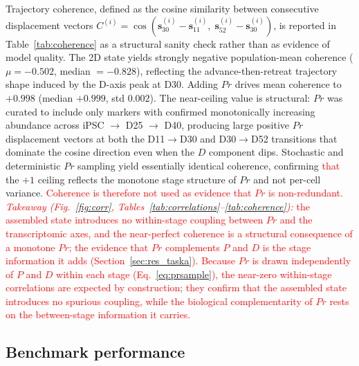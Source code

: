 \documentclass[5p,times,twocolumn]{elsarticle}
\newcommand{\rtag}[1]{}
\newcommand{\rev}[2]{\rtag{#1}\textcolor{red}{#2}}
\newcommand{\lang}[1]{\textcolor{red}{#1}}
\begin{document}
Trajectory coherence, defined as the cosine similarity between
consecutive displacement vectors
$C^{(i)} = \cos(\mathbf{s}^{(i)}_{30} - \mathbf{s}^{(i)}_{11},\;
\mathbf{s}^{(i)}_{52} - \mathbf{s}^{(i)}_{30})$,
is reported in Table~\ref{tab:coherence} as a structural sanity
check rather than as evidence of model quality.
The 2D state yields strongly negative population-mean coherence
($\mu = -0.502$, median $= -0.828$), reflecting the
advance-then-retreat trajectory shape induced by the D-axis
peak at D30.
Adding $Pr$ drives mean coherence to $+0.998$ (median $+0.999$,
std $0.002$).
The near-ceiling value is structural: $Pr$ was curated to
include only markers with confirmed monotonically increasing
abundance across iPSC $\to$ D25 $\to$ D40, producing large
positive $Pr$ displacement vectors at both the D11$\to$D30 and
D30$\to$D52 transitions that dominate the cosine direction even
when the $D$ component dips.
Stochastic and deterministic $Pr$ sampling yield essentially
identical coherence, confirming \lang{that} the $+1$ ceiling reflects the
monotone stage structure of $Pr$ and not per-cell variance.
\rev{AC}{Coherence is therefore not used as evidence that $Pr$ is
  non-redundant.}
\rev{R1.13}{\textit{Takeaway (Fig.~\ref{fig:corr},
    Tables~\ref{tab:correlations}--\ref{tab:coherence}):} the
  assembled state introduces no within-stage coupling between
  $Pr$ and the transcriptomic axes, and the near-perfect
  coherence is a structural consequence of a monotone $Pr$; the
  evidence that $Pr$ complements $P$ and $D$ is the stage
  information it adds (Section~\ref{sec:res_taska}).}
\rev{AC}{Because $Pr$ is drawn independently of $P$ and $D$
  within each stage (Eq.~\eqref{eq:prsample}), the near-zero
  within-stage correlations are expected by construction; they
  confirm that the assembled state introduces no spurious
  coupling, while the biological complementarity of $Pr$ rests
  on the between-stage information it carries.}

\subsection{\textbf{Benchmark performance}}
\label{sec:res_bench}
\end{document}
